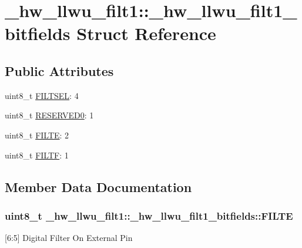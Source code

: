 \hypertarget{struct__hw__llwu__filt1_1_1__hw__llwu__filt1__bitfields}{}\section{\+\_\+hw\+\_\+llwu\+\_\+filt1\+:\+:\+\_\+hw\+\_\+llwu\+\_\+filt1\+\_\+bitfields Struct Reference}
\label{struct__hw__llwu__filt1_1_1__hw__llwu__filt1__bitfields}
\subsection*{Public Attributes}
\begin{DoxyCompactItemize}
\item 
uint8\+\_\+t \hyperlink{struct__hw__llwu__filt1_1_1__hw__llwu__filt1__bitfields_a6a6546d535e0fbb2af24f93571a42c05}{F\+I\+L\+T\+S\+EL}\+: 4
\item 
uint8\+\_\+t \hyperlink{struct__hw__llwu__filt1_1_1__hw__llwu__filt1__bitfields_a2a04eefbee21b8f75345ea1af2353395}{R\+E\+S\+E\+R\+V\+E\+D0}\+: 1
\item 
uint8\+\_\+t \hyperlink{struct__hw__llwu__filt1_1_1__hw__llwu__filt1__bitfields_a6b4114cf4b28906d66a56e198e0c7ff4}{F\+I\+L\+TE}\+: 2
\item 
uint8\+\_\+t \hyperlink{struct__hw__llwu__filt1_1_1__hw__llwu__filt1__bitfields_ad8512ac49e8cc5a14cf4cb03d7868e9b}{F\+I\+L\+TF}\+: 1
\end{DoxyCompactItemize}


\subsection{Member Data Documentation}
\subsubsection[{\texorpdfstring{F\+I\+L\+TE}{FILTE}}]{\setlength{\rightskip}{0pt plus 5cm}uint8\+\_\+t \+\_\+hw\+\_\+llwu\+\_\+filt1\+::\+\_\+hw\+\_\+llwu\+\_\+filt1\+\_\+bitfields\+::\+F\+I\+L\+TE}\hypertarget{struct__hw__llwu__filt1_1_1__hw__llwu__filt1__bitfields_a6b4114cf4b28906d66a56e198e0c7ff4}{}\label{struct__hw__llwu__filt1_1_1__hw__llwu__filt1__bitfields_a6b4114cf4b28906d66a56e198e0c7ff4}
\mbox{[}6\+:5\mbox{]} Digital Filter On External Pin 
